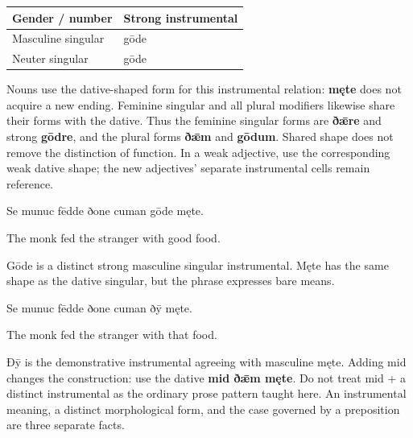 \par\begingroup
\fontsize{10.5}{13.2}\selectfont
\setlength{\LTleft}{0pt}\setlength{\LTright}{\fill}
\noindent
\begin{tabular}{@{}>{\raggedright\arraybackslash}p{56.08mm}>{\raggedright\arraybackslash}p{65.11mm}@{}}
\toprule
\textbf{Gender /\allowbreak{} number} & \textbf{Strong instrumental} \\
\midrule
Masculine singular & gōde \\
Neuter singular & gōde \\
\bottomrule
\end{tabular}
\par\endgroup

Nouns use the dative-shaped form for this instrumental relation: \textbf{męte} does not acquire a new ending. Feminine singular and all plural modifiers likewise share their forms with the dative. Thus the feminine singular forms are \textbf{ðǣre} and strong \textbf{gōdre}, and the plural forms \textbf{ðǣm} and \textbf{gōdum}. Shared shape does not remove the distinction of function. In a weak adjective, use the corresponding weak dative shape; the new adjectives' separate instrumental cells remain reference.

Se munuc fēdde ðone cuman gōde męte.

The monk fed the stranger with good food.

Gōde is a distinct strong masculine singular instrumental. Męte has the same shape as the dative singular, but the phrase expresses bare means.

Se munuc fēdde ðone cuman ðȳ męte.

The monk fed the stranger with that food.

Ðȳ is the demonstrative instrumental agreeing with masculine męte. Adding mid changes the construction: use the dative \textbf{mid ðǣm męte}. Do not treat mid + a distinct instrumental as the ordinary prose pattern taught here. An instrumental meaning, a distinct morphological form, and the case governed by a preposition are three separate facts.

